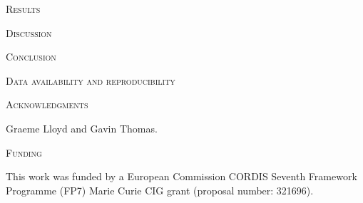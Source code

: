 \documentclass[12pt,letterpaper]{article}
\renewcommand{\section}[1]{%
\bigskip
\begin{center}
\begin{Large}
\normalfont\scshape #1
\medskip
\end{Large}
\end{center}}
\begin{document}
%
%

\section{Results}

%
%

\section{Discussion}


%
%

\section{Conclusion}



\section{Data availability and reproducibility}

\section{Acknowledgments}
Graeme Lloyd and Gavin Thomas.

\section{Funding} %
This work was funded by a European Commission CORDIS Seventh Framework Programme (FP7) Marie Curie CIG grant (proposal number: 321696).
\end{document}
